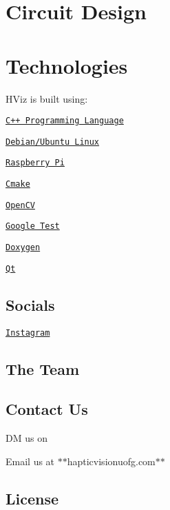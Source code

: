 \section*{Circuit Design}



\section*{Technologies}

H\+Viz is built using\+:


\begin{DoxyItemize}
\item \href{https://www.cplusplus.com/}{\tt C++ Programming Language}
\item \href{https://www.linux.org/}{\tt Debian/\+Ubuntu Linux}
\item \href{https://www.raspberrypi.org}{\tt Raspberry Pi}
\item \href{https://cmake.org/}{\tt Cmake}
\item \href{https://opencv.org/}{\tt Open\+CV}
\item \href{https://github.com/google/googletest}{\tt Google Test}
\item \href{https://www.doxygen.nl/index.html}{\tt Doxygen}
\item \href{https://www.qt.io/}{\tt Qt}
\end{DoxyItemize}

\subsection*{Socials}

\href{https://www.instagram.com/hapticvision_/}{\tt }


\begin{DoxyItemize}
\item \href{https://www.instagram.com/hapticvision_/}{\tt Instagram}
\end{DoxyItemize}

\subsection*{The Team}


\begin{DoxyItemize}
\item \href{https://github.com/rdj2829}{\tt }
\item \href{https://github.com/dheerajsankar}{\tt }
\item \href{https://github.com/kprakz}{\tt }
\item \href{https://github.com/josephjoel3099}{\tt }
\end{DoxyItemize}

\subsection*{Contact Us}


\begin{DoxyItemize}
\item DM us on \href{https://www.instagram.com/hapticvision_/}{\tt }
\item Email us at $\ast$$\ast$hapticvisionuofg.com$\ast$$\ast$
\end{DoxyItemize}

\subsection*{License}